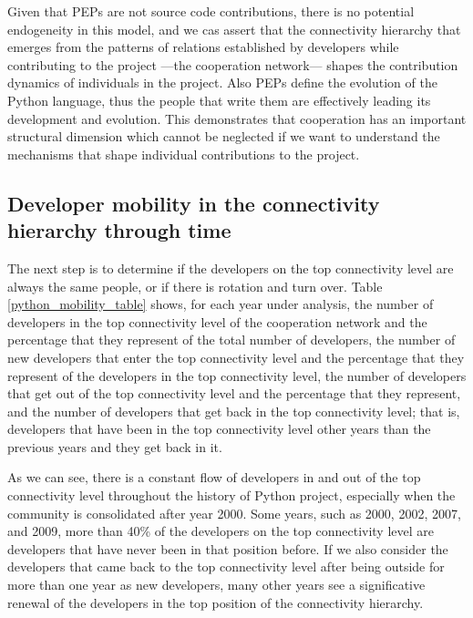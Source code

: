 Given that PEPs are not source code contributions, there is no potential endogeneity in this model, and we cas assert that the connectivity hierarchy that emerges from the patterns of relations established by developers while contributing to the project ---the cooperation network--- shapes the contribution dynamics of individuals in the project. Also PEPs define the evolution of the Python language, thus the people that write them are effectively leading its development and evolution. This demonstrates that cooperation has an important structural dimension which cannot be neglected if we want to understand the mechanisms that shape individual contributions to the project.

\subsection{Developer mobility in the connectivity hierarchy through time}

The next step is to determine if the developers on the top connectivity level are always the same people, or if there is rotation and turn over. Table \ref{python_mobility_table} shows, for each year under analysis, the number of developers in the top connectivity level of the cooperation network and the percentage that they represent of the total number of developers, the number of new developers that enter the top connectivity level and the percentage that they represent of the developers in the top connectivity level, the number of developers that get out of the top connectivity level and the percentage that they represent, and the number of developers that get back in the top connectivity level; that is, developers that have been in the top connectivity level other years than the previous years and they get back in it.



As we can see, there is a constant flow of developers in and out of the top connectivity level throughout the history of Python project, especially when the community is consolidated after year 2000. Some years, such as 2000, 2002, 2007, and 2009, more than 40\% of the developers on the top connectivity level are developers that have never been in that position before. If we also consider the developers that came back to the top connectivity level after being outside for more than one year as new developers, many other years see a significative renewal of the developers in the top position of the connectivity hierarchy.


